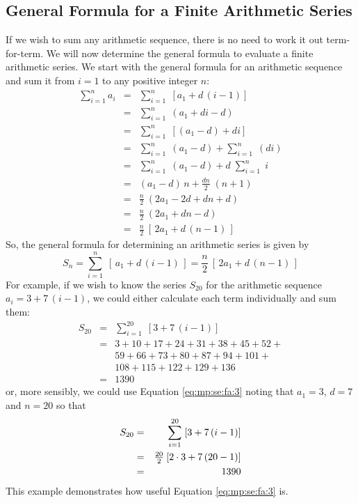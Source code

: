 \subsection{General Formula for a Finite Arithmetic Series}
If we wish to sum any arithmetic sequence, there is no need to work it out term-for-term. We will now determine the general formula to evaluate a finite arithmetic series. We start with the general formula for an arithmetic sequence and sum it from $i=1$ to any positive integer $n$:
\begin{eqnarray*}
\sum_{i=1}^n a_i &=& \sum_{i=1}^n \; [a_1 + d \, (i-1)] \\
&=& \sum_{i=1}^n \; (a_1 + di - d) \\
&=& \sum_{i=1}^n \; [(a_1 - d) + di] \\
&=& \sum_{i=1}^n \; (a_1 - d) + \sum_{i=1}^n \; (di) \\
&=& \sum_{i=1}^n \; (a_1 - d) + d \; \sum_{i=1}^n \; i \\
&=& (a_1 - d) \, n + \frac {dn}{2} \; (n + 1) \\
&=& \frac{n}{2} \: (2a_1 - 2d + dn + d) \\
&=& \frac{n}{2} \: (2a_1 + dn - d) \\
&=& \frac{n}{2} \: [\, 2a_1 + d \, (n - 1) \,]
\end{eqnarray*}
So, the general formula for determining an arithmetic series is given by
\begin{equation}
\label{eq:mp:se:fa:3}
\boxed {S_n = \sum_{i=1}^n \; [\, a_1 + d \, (i-1) \,] = \frac{n}{2} \: [\, 2a_1 + d \, (n - 1) \,]}
\end{equation}
For example, if we wish to know the series $S_{20}$ for the arithmetic sequence $a_i= 3 + 7 \, (i-1)$, we could either calculate each term individually and sum them:
\begin{eqnarray*}
S_{20} &=& \sum_{i=1}^{20} \; [3 + 7 \, (i-1)] \\
&=& 3 + 10 + 17 + 24 + 31 + 38 + 45 + 52 + \\
&& 59 + 66 + 73 + 80 + 87 + 94 + 101 + \\
&& 108 + 115 + 122 + 129 + 136 \\
&=& 1390
\end{eqnarray*}
or, more sensibly, we could use Equation \eqref{eq:mp:se:fa:3} noting that $a_1=3$, $d=7$ and $n=20$ so that
\begin{eqnarray*}
\label{eq:mp:se:fa:ex:smartway}
S_{20} &=& \sum_{i=1}^{20} \; [3 + 7 \, (i-1)] \\
&=& \textstyle \small {\frac{20}{2}} \: [2 \cdot 3 + 7 \, (20 - 1) ] \\
&=& 1390
\end{eqnarray*}
This example demonstrates how useful Equation \eqref{eq:mp:se:fa:3} is.

